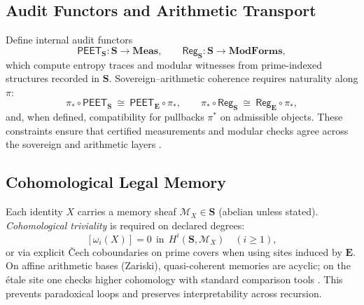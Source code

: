 \documentclass[12pt]{amsart}
\theoremstyle{plain}
\begin{document}
\subsection{Audit Functors and Arithmetic Transport}
Define internal audit functors
\[
\mathsf{PEET}_{\mathbf{S}}:\mathbf{S}\to\mathbf{Meas},\qquad
\mathsf{Reg}_{\mathbf{S}}:\mathbf{S}\to\mathbf{ModForms},
\]
which compute entropy traces and modular witnesses from prime-indexed structures recorded in $\mathbf{S}$. Sovereign–arithmetic coherence requires naturality along $\pi$:
\[
\pi_{\ast}\circ \mathsf{PEET}_{\mathbf{S}}\ \cong\ \mathsf{PEET}_{\mathbf{E}}\circ \pi_{\ast},
\qquad
\pi_{\ast}\circ \mathsf{Reg}_{\mathbf{S}}\ \cong\ \mathsf{Reg}_{\mathbf{E}}\circ \pi_{\ast},
\]
and, when defined, compatibility for pullbacks $\pi^{\ast}$ on admissible objects. These constraints ensure that certified measurements and modular checks agree across the sovereign and arithmetic layers \cite{maclane1992sheaves,johnstone2002elephant,milne1980etale}.

\subsection{Cohomological Legal Memory}
Each identity $X$ carries a memory sheaf $\mathscr{M}_X\in\mathbf{S}$ (abelian unless stated). \emph{Cohomological triviality} is required on declared degrees:
\[
[\omega_i(X)]=0\ \ \text{in}\ \ H^i(\mathbf{S},\mathscr{M}_X)\quad (i\ge1),
\]
or via explicit Čech coboundaries on prime covers when using sites induced by $\mathbf{E}$. On affine arithmetic bases (Zariski), quasi-coherent memories are acyclic; on the étale site one checks higher cohomology with standard comparison tools \cite{hartshorne1977algebraic,milne1980etale,maclane1992sheaves,johnstone2002elephant}. This prevents paradoxical loops and preserves interpretability across recursion.
\end{document}
